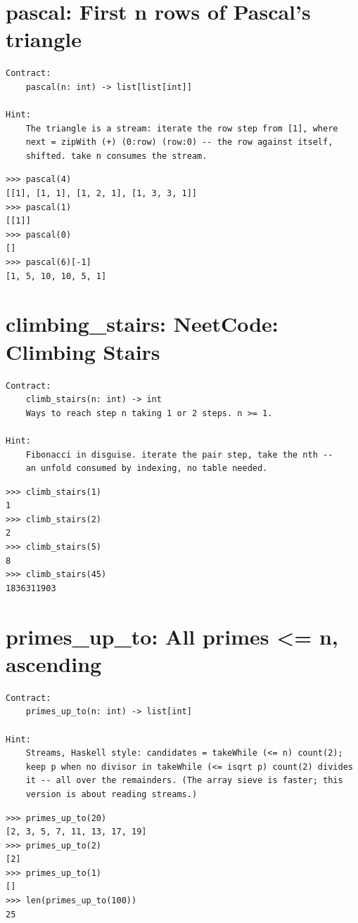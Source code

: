 \documentclass[10pt,letterpaper]{book}
\begin{document}
\section{pascal: First n rows of Pascal's triangle}
\begin{lstlisting}[style=ex]
Contract:
    pascal(n: int) -> list[list[int]]

Hint:
    The triangle is a stream: iterate the row step from [1], where
    next = zipWith (+) (0:row) (row:0) -- the row against itself,
    shifted. take n consumes the stream.
\end{lstlisting}
\begin{lstlisting}[style=ex]
>>> pascal(4)
[[1], [1, 1], [1, 2, 1], [1, 3, 3, 1]]
>>> pascal(1)
[[1]]
>>> pascal(0)
[]
>>> pascal(6)[-1]
[1, 5, 10, 10, 5, 1]
\end{lstlisting}

\section{climbing\_stairs: NeetCode: Climbing Stairs}
\begin{lstlisting}[style=ex]
Contract:
    climb_stairs(n: int) -> int
    Ways to reach step n taking 1 or 2 steps. n >= 1.

Hint:
    Fibonacci in disguise. iterate the pair step, take the nth --
    an unfold consumed by indexing, no table needed.
\end{lstlisting}
\begin{lstlisting}[style=ex]
>>> climb_stairs(1)
1
>>> climb_stairs(2)
2
>>> climb_stairs(5)
8
>>> climb_stairs(45)
1836311903
\end{lstlisting}

\section{primes\_up\_to: All primes <= n, ascending}
\begin{lstlisting}[style=ex]
Contract:
    primes_up_to(n: int) -> list[int]

Hint:
    Streams, Haskell style: candidates = takeWhile (<= n) count(2);
    keep p when no divisor in takeWhile (<= isqrt p) count(2) divides
    it -- all over the remainders. (The array sieve is faster; this
    version is about reading streams.)
\end{lstlisting}
\begin{lstlisting}[style=ex]
>>> primes_up_to(20)
[2, 3, 5, 7, 11, 13, 17, 19]
>>> primes_up_to(2)
[2]
>>> primes_up_to(1)
[]
>>> len(primes_up_to(100))
25
\end{lstlisting}
\end{document}
